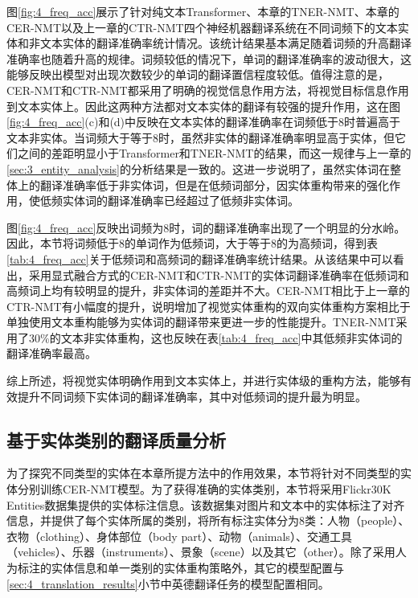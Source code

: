 图\ref{fig:4_freq_acc}展示了针对纯文本Transformer、本章的TNER-NMT、本章的CER-NMT以及上一章的CTR-NMT四个神经机器翻译系统在不同词频下的文本实体和非文本实体的翻译准确率统计情况。该统计结果基本满足随着词频的升高翻译准确率也随着升高的规律。词频较低的情况下，单词的翻译准确率的波动很大，这能够反映出模型对出现次数较少的单词的翻译置信程度较低。值得注意的是，CER-NMT和CTR-NMT都采用了明确的视觉信息作用方法，将视觉目标信息作用到文本实体上。因此这两种方法都对文本实体的翻译有较强的提升作用，这在图\ref{fig:4_freq_acc}(c)和(d)中反映在文本实体的翻译准确率在词频低于8时普遍高于文本非实体。当词频大于等于8时，虽然非实体的翻译准确率明显高于实体，但它们之间的差距明显小于Transformer和TNER-NMT的结果，而这一规律与上一章的\ref{sec:3_entity_analysis}的分析结果是一致的。这进一步说明了，虽然实体词在整体上的翻译准确率低于非实体词，但是在低频词部分，因实体重构带来的强化作用，使低频实体词的翻译准确率已经超过了低频非实体词。


图\ref{fig:4_freq_acc}反映出词频为8时，词的翻译准确率出现了一个明显的分水岭。因此，本节将词频低于8的单词作为低频词，大于等于8的为高频词，得到表\ref{tab:4_freq_acc}关于低频词和高频词的翻译准确率统计结果。从该结果中可以看出，采用显式融合方式的CER-NMT和CTR-NMT的实体词翻译准确率在低频词和高频词上均有较明显的提升，非实体词的差距并不大。CER-NMT相比于上一章的CTR-NMT有小幅度的提升，说明增加了视觉实体重构的双向实体重构方案相比于单独使用文本重构能够为实体词的翻译带来更进一步的性能提升。TNER-NMT采用了30\%的文本非实体重构，这也反映在表\ref{tab:4_freq_acc}中其低频非实体词的翻译准确率最高。

综上所述，将视觉实体明确作用到文本实体上，并进行实体级的重构方法，能够有效提升不同词频下实体词的翻译准确率，其中对低频词的提升最为明显。


\subsection{基于实体类别的翻译质量分析}
\label{sec:4_entity_categories}


为了探究不同类型的实体在本章所提方法中的作用效果，本节将针对不同类型的实体分别训练CER-NMT模型。为了获得准确的实体类别，本节将采用Flickr30K Entities数据集提供的实体标注信息。该数据集对图片和文本中的实体标注了对齐信息，并提供了每个实体所属的类别，将所有标注实体分为8类：人物（people）、衣物（clothing）、身体部位（body part）、动物（animals）、交通工具（vehicles）、乐器（instruments）、景象（scene）以及其它（other）。除了采用人为标注的实体信息和单一类别的实体重构策略外，其它的模型配置与\ref{sec:4_translation_results}小节中英德翻译任务的模型配置相同。

